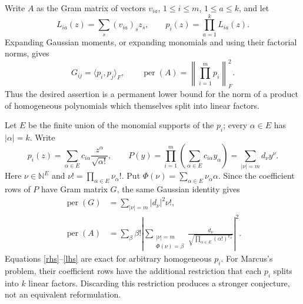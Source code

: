 \documentclass[11pt]{article}
\newcommand{\per}{\operatorname{per}}
\newcommand{\N}{\mathbb N}
\begin{document}
Write $A$ as the Gram matrix of vectors $v_{ia}$, $1\leq i\leq m$,
$1\leq a\leq k$, and let
\[
 L_{ia}(z)=\sum_s(v_{ia})_s z_s,\qquad p_i(z)=\prod_{a=1}^k L_{ia}(z).
\]
Expanding Gaussian moments, or expanding monomials and using their factorial
norms, gives
\begin{equation}\label{fock}
 G_{ij}=\langle p_i,p_j\rangle_F,
 \qquad \per(A)=\left\|\prod_{i=1}^m p_i\right\|_F^2.
\end{equation}
Thus the desired assertion is a permanent lower bound for the norm of a product
of homogeneous polynomials which themselves split into linear factors.

Let $E$ be the finite union of the monomial supports of the $p_i$; every
$\alpha\in E$ has $|\alpha|=k$. Write
\[
 p_i(z)=\sum_{\alpha\in E}c_{i\alpha}\frac{z^\alpha}{\sqrt{\alpha!}},
 \qquad
 P(y)=\prod_{i=1}^m\left(\sum_{\alpha\in E}c_{i\alpha}y_\alpha\right)
     =\sum_{|\nu|=m}d_\nu y^\nu.
\]
Here $\nu\in\N^E$ and $\nu!=\prod_{\alpha\in E}\nu_\alpha!$.
Put $\Phi(\nu)=\sum_{\alpha\in E}\nu_\alpha\alpha$. Since the coefficient
rows of $P$ have Gram matrix $G$, the same Gaussian identity gives
\begin{align}
 \per(G)&=\sum_{|\nu|=m}|d_\nu|^2\nu!,\label{rhs}\\
 \per(A)&=\sum_\beta\beta!\left|
       \sum_{\substack{|\nu|=m\\\Phi(\nu)=\beta}}
       \frac{d_\nu}{\sqrt{\prod_{\alpha\in E}(\alpha!)^{\nu_\alpha}}}
                         \right|^2.\label{lhs}
\end{align}
Equations \eqref{rhs}--\eqref{lhs} are exact for arbitrary homogeneous $p_i$.
For Marcus's problem, their coefficient rows have the additional restriction
that each $p_i$ splits into $k$ linear factors. Discarding this restriction
produces a stronger conjecture, not an equivalent reformulation.
\end{document}
